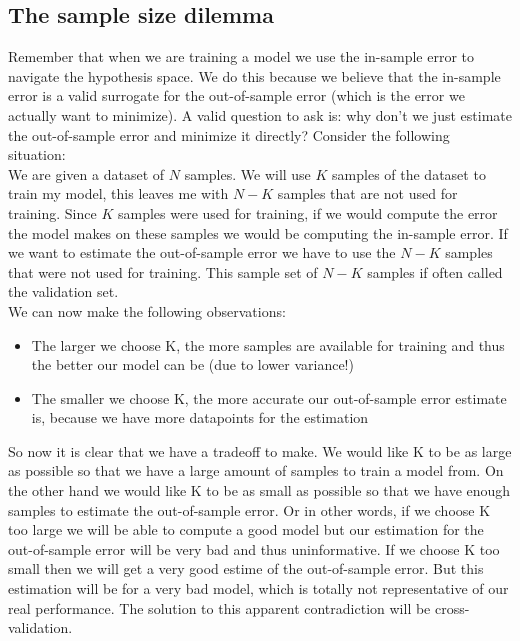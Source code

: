 \subsection{The sample size dilemma}
Remember that when we are training a model we use the in-sample error to navigate the hypothesis space. We do this because we believe that the in-sample error is a valid surrogate for the out-of-sample error (which is the error we actually want to minimize).
A valid question to ask is: why don't we just estimate the out-of-sample error and minimize it directly? Consider the following situation: \\
We are given a dataset of $N$ samples. We will use $K$ samples of the dataset to train my model, this leaves me with $N-K$ samples that are not used for training. Since $K$ samples were used for training, if we would compute the error the model makes on these samples we would be computing the in-sample error. If we want to estimate the out-of-sample error we have to use the $N-K$ samples that were not used for training. This sample set of $N-K$ samples if often called the validation set.\\
We can now make the following observations:
\begin{itemize}
	\item The larger we choose K, the more samples are available for training and thus the better our model can be (due to lower variance!)
	\item The smaller we choose K, the more accurate our out-of-sample error estimate is, because we have more datapoints for the estimation
\end{itemize}
So now it is clear that we have a tradeoff to make. We would like K to be as large as possible so that we have a large amount of samples to train a model from. On the other hand we would like K to be as small as possible so that we have enough samples to estimate the out-of-sample error. Or in other words, if we choose K too large we will be able to compute a good model but our estimation for the out-of-sample error will be very bad and thus uninformative. If we choose K too small then we will get a very good estime of the out-of-sample error. But this estimation will be for a very bad model, which is totally not representative of our real performance. The solution to this apparent contradiction will be cross-validation.
